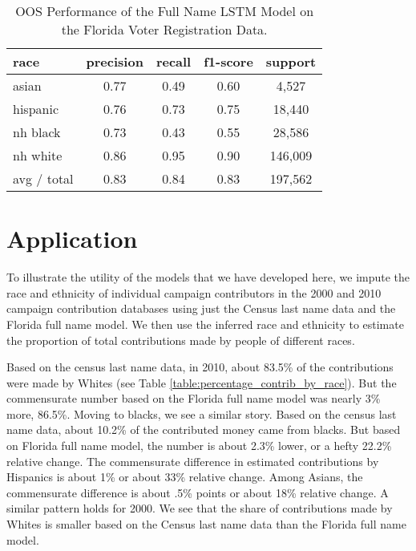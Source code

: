 \documentclass[12pt, letterpaper]{article}
\begin{document}
\begin{table}[h!]
\centering
\caption{OOS Performance of the Full Name LSTM Model on the Florida Voter Registration Data.}
\begin{tabular}{ l c c c c }
\hline    
   race & precision & recall & f1-score & support\\
\hline
      asian &        0.77 &       0.49 &       0.60 &       4,527\\
   hispanic &        0.76 &       0.73 &       0.75 &      18,440\\
   nh black &        0.73 &       0.43 &       0.55 &      28,586\\
   nh white &        0.86 &       0.95 &       0.90 &     146,009\\

avg / total &        0.83 &       0.84 &       0.83 &     197,562\\
\hline
\end{tabular}
\label{table:full_name_fl_voter_reg}
\end{table}


\section*{Application}
To illustrate the utility of the models that we have developed here, we impute the race and ethnicity of individual campaign contributors in the 2000 and 2010 campaign contribution databases \citep{bonica2017database} using just the Census last name data and the Florida full name model. We then use the inferred race and ethnicity to estimate the proportion of total contributions made by people of different races. 

Based on the census last name data, in 2010, about 83.5\% of the contributions were made by Whites (see Table \ref{table:percentage_contrib_by_race}). But the commensurate number based on the Florida full name model was nearly 3\% more, 86.5\%. Moving to blacks, we see a similar story. Based on the census last name data, about 10.2\% of the contributed money came from blacks. But based on Florida full name model, the number is about 2.3\% lower, or a hefty 22.2\% relative change. The commensurate difference in estimated contributions by Hispanics is about 1\% or about 33\% relative change. Among Asians, the commensurate difference is about .5\% points or about 18\% relative change. A similar pattern holds for 2000. We see that the share of contributions made by Whites is smaller based on the Census last name data than the Florida full name model.
\end{document}

